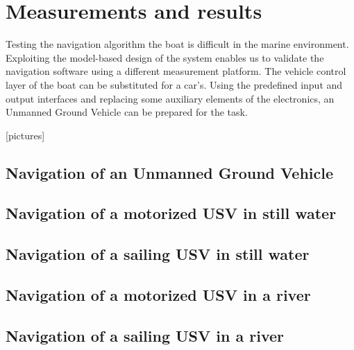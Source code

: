 \section{Measurements and results}

Testing the navigation algorithm the boat is difficult in the marine environment. Exploiting the model-based design of the system enables us to validate the navigation software using a different measurement platform. The vehicle control layer of the boat can be substituted for a car's. Using the predefined input and output interfaces and replacing some auxiliary elements of the electronics, an Unmanned Ground Vehicle can be prepared for the task.

[pictures]

\subsection{Navigation of an Unmanned Ground Vehicle}

\subsection{Navigation of a motorized USV in still water}

\subsection{Navigation of a sailing USV in still water}

\subsection{Navigation of a motorized USV in a river}

\subsection{Navigation of a sailing USV in a river}